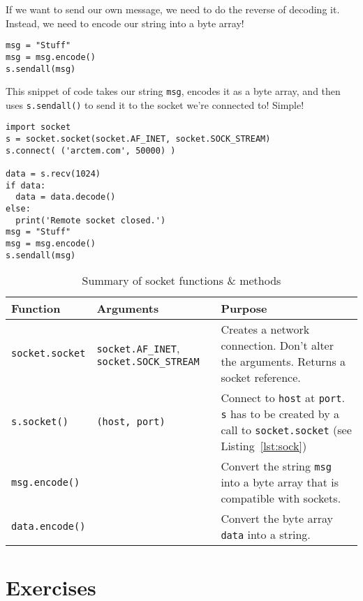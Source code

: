 \documentclass[11pt]{cselabheader}
\begin{document}
If we want to send our own message, we need to do the reverse of decoding it. Instead, we
need to encode our string into a byte array!

\begin{lstlisting}
msg = "Stuff"
msg = msg.encode()
s.sendall(msg)
\end{lstlisting}

This snippet of code takes our string \lstinline{msg}, encodes it as a byte array, and then
uses \lstinline{s.sendall()} to send it to the socket we're connected to! Simple!

\begin{lstlisting}[style=python,label={lst:sock},caption={Code that shows usage, but does not
actually make sense}]
import socket
s = socket.socket(socket.AF_INET, socket.SOCK_STREAM)
s.connect( ('arctem.com', 50000) )

data = s.recv(1024)
if data:
  data = data.decode()
else:
  print('Remote socket closed.')
msg = "Stuff"
msg = msg.encode()
s.sendall(msg)
\end{lstlisting}

\begin{table}[!ht]
  \centering
  \begin{tabular}{p{2.5cm} p{3.3cm} p{10cm}}
    \toprule
    \bfseries Function & \bfseries Arguments & \bfseries Purpose \\
    \midrule
    \lstinline!socket.socket! & \lstinline!socket.AF_INET!, \lstinline!socket.SOCK_STREAM! &
    Creates a network connection. Don't alter the arguments. Returns a socket
    reference.\\
    \lstinline!s.socket()! & \lstinline!(host, port)! & Connect to
    \lstinline!host! at \lstinline!port!. \lstinline!s! has to be created by a
    call to \lstinline!socket.socket! (see Listing~\ref{lst:sock})\\
    \lstinline!msg.encode()! & & Convert the string \lstinline{msg} into a byte array
    that is compatible with sockets.\\
    \lstinline!data.encode()! & & Convert the byte array \lstinline{data} into a string.\\
    \bottomrule
  \end{tabular}
  \caption{Summary of socket functions \& methods}
  \label{tab:sum}
\end{table}

\pagebreak

\section{Exercises}
\label{sec:ex}
\end{document}
